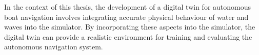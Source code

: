 \begin{textblock}
In the context of this thesis, the development of a digital twin for autonomous boat navigation involves integrating accurate physical behaviour of water and waves into the simulator. By incorporating these aspects into the simulator, the digital twin can provide a realistic environment for training and evaluating the autonomous navigation system.

\end{textblock}
\clearpage